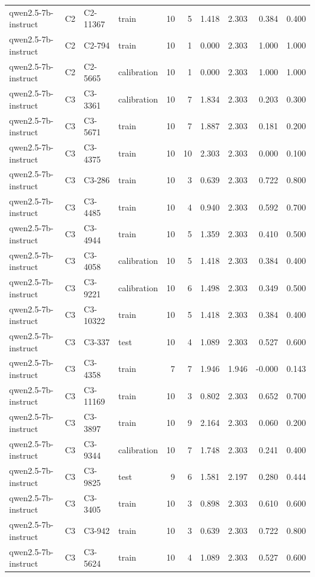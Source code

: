 \begin{table}
\begin{tabular}{llllrrrrrr}
qwen2.5-7b-instruct & C2 & C2-11367 & train & 10 & 5 & 1.418 & 2.303 & 0.384 & 0.400 \\
qwen2.5-7b-instruct & C2 & C2-794 & train & 10 & 1 & 0.000 & 2.303 & 1.000 & 1.000 \\
qwen2.5-7b-instruct & C2 & C2-5665 & calibration & 10 & 1 & 0.000 & 2.303 & 1.000 & 1.000 \\
qwen2.5-7b-instruct & C3 & C3-3361 & calibration & 10 & 7 & 1.834 & 2.303 & 0.203 & 0.300 \\
qwen2.5-7b-instruct & C3 & C3-5671 & train & 10 & 7 & 1.887 & 2.303 & 0.181 & 0.200 \\
qwen2.5-7b-instruct & C3 & C3-4375 & train & 10 & 10 & 2.303 & 2.303 & 0.000 & 0.100 \\
qwen2.5-7b-instruct & C3 & C3-286 & train & 10 & 3 & 0.639 & 2.303 & 0.722 & 0.800 \\
qwen2.5-7b-instruct & C3 & C3-4485 & train & 10 & 4 & 0.940 & 2.303 & 0.592 & 0.700 \\
qwen2.5-7b-instruct & C3 & C3-4944 & train & 10 & 5 & 1.359 & 2.303 & 0.410 & 0.500 \\
qwen2.5-7b-instruct & C3 & C3-4058 & calibration & 10 & 5 & 1.418 & 2.303 & 0.384 & 0.400 \\
qwen2.5-7b-instruct & C3 & C3-9221 & calibration & 10 & 6 & 1.498 & 2.303 & 0.349 & 0.500 \\
qwen2.5-7b-instruct & C3 & C3-10322 & train & 10 & 5 & 1.418 & 2.303 & 0.384 & 0.400 \\
qwen2.5-7b-instruct & C3 & C3-337 & test & 10 & 4 & 1.089 & 2.303 & 0.527 & 0.600 \\
qwen2.5-7b-instruct & C3 & C3-4358 & train & 7 & 7 & 1.946 & 1.946 & -0.000 & 0.143 \\
qwen2.5-7b-instruct & C3 & C3-11169 & train & 10 & 3 & 0.802 & 2.303 & 0.652 & 0.700 \\
qwen2.5-7b-instruct & C3 & C3-3897 & train & 10 & 9 & 2.164 & 2.303 & 0.060 & 0.200 \\
qwen2.5-7b-instruct & C3 & C3-9344 & calibration & 10 & 7 & 1.748 & 2.303 & 0.241 & 0.400 \\
qwen2.5-7b-instruct & C3 & C3-9825 & test & 9 & 6 & 1.581 & 2.197 & 0.280 & 0.444 \\
qwen2.5-7b-instruct & C3 & C3-3405 & train & 10 & 3 & 0.898 & 2.303 & 0.610 & 0.600 \\
qwen2.5-7b-instruct & C3 & C3-942 & train & 10 & 3 & 0.639 & 2.303 & 0.722 & 0.800 \\
qwen2.5-7b-instruct & C3 & C3-5624 & train & 10 & 4 & 1.089 & 2.303 & 0.527 & 0.600 \\

\end{tabular}
\end{table}
